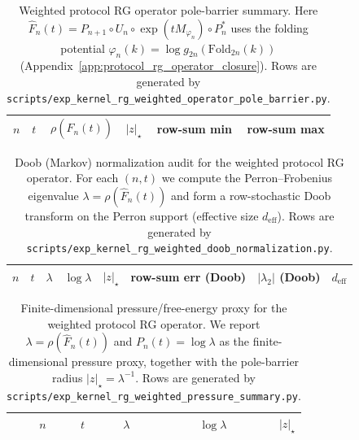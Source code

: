 \begin{table}[H]
\centering
\scriptsize
\setlength{\tabcolsep}{6pt}
\renewcommand{\arraystretch}{1.15}
\begin{tabular}{rrrrrr}
\toprule
$n$ & $t$ & $\rho(\widehat F_n(t))$ & $|z|_\star$ & row-sum min & row-sum max \\
\midrule
%
\end{tabular}
\caption{Weighted protocol RG operator pole-barrier summary.
Here $\widehat F_n(t)=P_{n+1}\circ U_n\circ \exp(tM_{\varphi_n})\circ P_n^\ast$ uses the folding potential $\varphi_n(k)=\log g_{2n}(\mathrm{Fold}_{2n}(k))$ (Appendix~\ref{app:protocol_rg_operator_closure}).
Rows are generated by \texttt{scripts/exp\_kernel\_rg\_weighted\_operator\_pole\_barrier.py}.}
\label{tab:kernel_rg_weighted_pole_barrier}
\end{table}

\begin{table}[H]
\centering
\scriptsize
\setlength{\tabcolsep}{6pt}
\renewcommand{\arraystretch}{1.15}
\begin{tabular}{rrrrrrrr}
\toprule
$n$ & $t$ & $\lambda$ & $\log\lambda$ & $|z|_\star$ & row-sum err (Doob) & $|\lambda_2|$ (Doob) & $d_{\mathrm{eff}}$ \\
\midrule
%
\end{tabular}
\caption{Doob (Markov) normalization audit for the weighted protocol RG operator.
For each $(n,t)$ we compute the Perron--Frobenius eigenvalue $\lambda=\rho(\widehat F_n(t))$ and form a row-stochastic Doob transform on the Perron support (effective size $d_{\mathrm{eff}}$).
Rows are generated by \texttt{scripts/exp\_kernel\_rg\_weighted\_doob\_normalization.py}.}
\label{tab:kernel_rg_weighted_doob}
\end{table}

\begin{table}[H]
\centering
\scriptsize
\setlength{\tabcolsep}{6pt}
\renewcommand{\arraystretch}{1.15}
\begin{tabular}{rrrrr}
\toprule
$n$ & $t$ & $\lambda$ & $\log\lambda$ & $|z|_\star$ \\
\midrule
%
\end{tabular}
\caption{Finite-dimensional pressure/free-energy proxy for the weighted protocol RG operator.
We report $\lambda=\rho(\widehat F_n(t))$ and $P_n(t)=\log\lambda$ as the finite-dimensional pressure proxy, together with the pole-barrier radius $|z|_\star=\lambda^{-1}$.
Rows are generated by \texttt{scripts/exp\_kernel\_rg\_weighted\_pressure\_summary.py}.}
\label{tab:kernel_rg_weighted_pressure}
\end{table}

